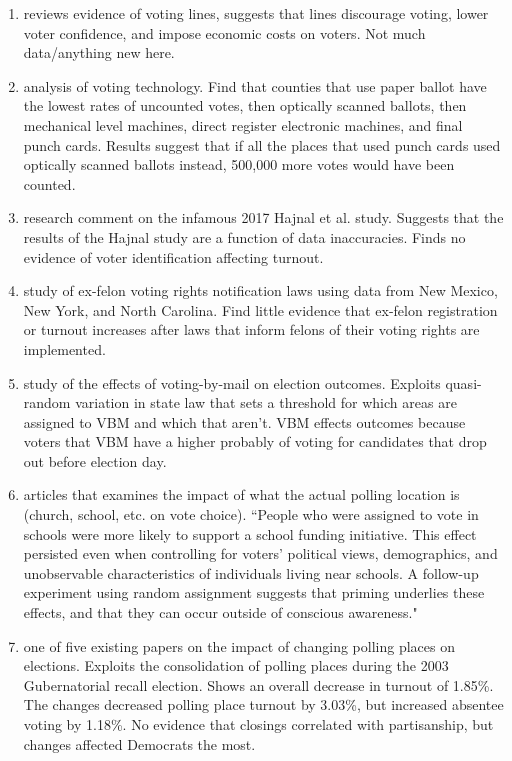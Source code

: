\documentclass[12pt]{article}
\begin{document}
\begin{enumerate}
\item \citet{stewart2015waiting} reviews evidence of voting lines, suggests that lines discourage voting, lower voter confidence, and impose economic costs on voters. Not much data/anything new here. 

\item \citet{ansolabehere2005residual} analysis of voting technology. Find that counties that use paper ballot have the lowest rates of uncounted votes, then optically scanned ballots, then mechanical level machines, direct register electronic machines, and final punch cards. Results suggest that if all the places that used punch cards used optically scanned ballots instead, 500,000 more votes would have been counted. 

\item \citet{grimmer2017comment} research comment on the infamous 2017 Hajnal et al. study. Suggests that the results of the Hajnal study are a function of data inaccuracies. Finds no evidence of voter identification affecting turnout. 

\item \citet{meredith2014voting} study of ex-felon voting rights notification laws using data from New Mexico, New York, and North Carolina. Find little evidence that ex-felon registration or turnout increases after laws that inform felons of their voting rights are implemented. 

\item \citet{meredith2011convenience} study of the effects of voting-by-mail on election outcomes. Exploits quasi-random variation in state law that sets a threshold for which areas are assigned to VBM and which that aren't. VBM effects outcomes because voters that VBM have a higher probably of voting for candidates that drop out before election day. 

\item \citet{berger2008contextual} articles that examines the impact of what the actual polling location is (church, school, etc. on vote choice). ``People who were assigned to vote in schools were more likely to support a school funding initiative. This effect persisted even when controlling for voters' political views, demographics, and unobservable characteristics of individuals living near schools. A follow-up experiment using random assignment suggests that priming underlies these effects, and that they can occur outside of conscious awareness." 

\item \citet{brady2011turning} one of five existing papers on the impact of changing polling places on elections. Exploits the consolidation of polling places during the 2003 Gubernatorial recall election. Shows an overall decrease in turnout of 1.85\%. The changes decreased polling place turnout by 3.03\%, but increased absentee voting by 1.18\%. No evidence that closings correlated with partisanship, but changes affected Democrats the most. 


\end{enumerate}
\end{document}
